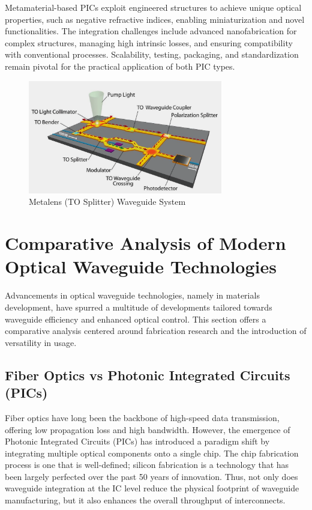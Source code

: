 \documentclass[10pt]{article}
\begin{document}
Metamaterial-based PICs exploit engineered structures to achieve unique optical properties, such as negative refractive indices, enabling miniaturization and novel functionalities. The integration challenges include advanced nanofabrication for complex structures, managing high intrinsic losses, and ensuring compatibility with conventional processes. Scalability, testing, packaging, and standardization remain pivotal for the practical application of both PIC types.


\begin{figure}[h]
    \centering
    \includegraphics[width=8.5cm]{IMG_0411.png}
    \caption{Metalens (TO Splitter) Waveguide System} 
    \end{figure}
\section{Comparative Analysis of Modern Optical Waveguide Technologies}

Advancements in optical waveguide technologies, namely in materials development, have spurred a multitude of developments tailored towards waveguide efficiency and enhanced optical control. This section offers a comparative analysis centered around fabrication research and the introduction of versatility in usage.

\subsection{Fiber Optics vs Photonic Integrated Circuits (PICs)}

Fiber optics have long been the backbone of high-speed data transmission, offering low propagation loss and high bandwidth. However, the emergence of Photonic Integrated Circuits (PICs) has introduced a paradigm shift by integrating multiple optical components onto a single chip. The chip fabrication process is one that is well-defined; silicon fabrication is a technology that has been largely perfected over the past 50 years of innovation. Thus, not only does waveguide integration at the IC level reduce the physical footprint of waveguide manufacturing, but it also enhances the overall throughput of interconnects. 
\end{document}

